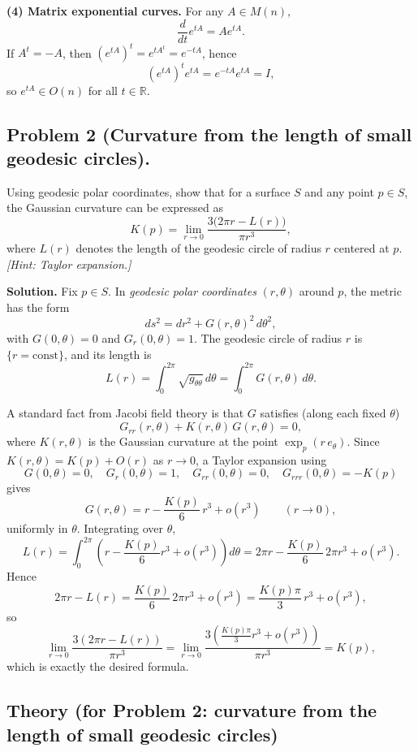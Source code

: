 \documentclass[12pt,a4paper]{article}
\theoremstyle{plain}
\theoremstyle{definition}      %
\begin{document}
\medskip
\noindent\textbf{(4) Matrix exponential curves.}
For any \(A\in M(n)\),
\[
\frac{d}{dt}e^{tA}=Ae^{tA}.
\]
If \(A^{t}=-A\), then \((e^{tA})^{t}=e^{tA^{t}}=e^{-tA}\), hence
\[
(e^{tA})^{t}e^{tA}=e^{-tA}e^{tA}=I,
\]
so \(e^{tA}\in O(n)\) for all \(t\in\mathbb{R}\).



\bigskip

\subsection*{Problem 2 (Curvature from the length of small geodesic circles).}
Using geodesic polar coordinates, show that for a surface \(S\) and any point \(p\in S\), the Gaussian curvature can be expressed as
\[
K(p)=\lim_{r\to 0}\frac{3\bigl(2\pi r-L(r)\bigr)}{\pi r^{3}},
\]
where \(L(r)\) denotes the length of the geodesic circle of radius \(r\) centered at \(p\).
\emph{[Hint: Taylor expansion.]}


\textbf{Solution.}
Fix \(p\in S\). In \emph{geodesic polar coordinates} \((r,\theta)\) around \(p\), the metric has the form
\[
ds^{2}=dr^{2}+G(r,\theta)^{2}\,d\theta^{2},
\]
with \(G(0,\theta)=0\) and \(G_{r}(0,\theta)=1\). The geodesic circle of radius \(r\) is \(\{r=\text{const}\}\), and its length is
\[
L(r)=\int_{0}^{2\pi} \sqrt{g_{\theta\theta}}\,d\theta=\int_{0}^{2\pi} G(r,\theta)\,d\theta.
\]

A standard fact from Jacobi field theory is that \(G\) satisfies (along each fixed \(\theta\))
\[
G_{rr}(r,\theta)+K(r,\theta)\,G(r,\theta)=0,
\]
where \(K(r,\theta)\) is the Gaussian curvature at the point \(\exp_p(r\,e_\theta)\).
Since \(K(r,\theta)=K(p)+O(r)\) as \(r\to 0\), a Taylor expansion using
\[
G(0,\theta)=0,\quad G_r(0,\theta)=1,\quad G_{rr}(0,\theta)=0,\quad
G_{rrr}(0,\theta)=-K(p)
\]
gives
\[
G(r,\theta)=r-\frac{K(p)}{6}\,r^{3}+o(r^{3})\qquad (r\to 0),
\]
uniformly in \(\theta\). Integrating over \(\theta\),
\[
L(r)=\int_{0}^{2\pi}\left(r-\frac{K(p)}{6}r^{3}+o(r^{3})\right)d\theta
=2\pi r-\frac{K(p)}{6}\,2\pi r^{3}+o(r^{3}).
\]
Hence
\[
2\pi r-L(r)=\frac{K(p)}{6}\,2\pi r^{3}+o(r^{3})=\frac{K(p)\pi}{3}\,r^{3}+o(r^{3}),
\]
so
\[
\lim_{r\to 0}\frac{3(2\pi r-L(r))}{\pi r^{3}}
=\lim_{r\to 0}\frac{3\left(\frac{K(p)\pi}{3}r^{3}+o(r^{3})\right)}{\pi r^{3}}
=K(p),
\]
which is exactly the desired formula.


\subsection*{Theory (for Problem 2: curvature from the length of small geodesic circles)}
\end{document}
